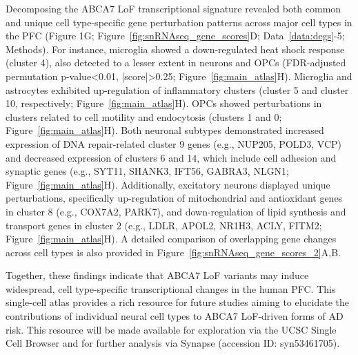 \newcommand{\quoteG}{\textcolor{blue}{The two-dimensional visualization effectively captured the transcriptional landscape of ABCA7 LoF gene changes across all major cell types (Fig1F; Figure~\ref{fig:snRNAseq_gene_scores}A). To summarize this landscape in terms of biological pathways, we grouped genes into clusters based on their positions in the 2D projection and analyzed each cluster for enrichment in biological pathways using the Gene Ontology Biological Process database (Figure~\ref{fig:main_atlas}G; see Methods). This analysis identified several biological pathways broadly affected by ABCA7 LoF in the postmortem human PFC, including pathways related to heat shock response, inflammation, cell dynamics and adhesion, synaptic function, DNA repair, and cellular metabolism (Figure~\ref{fig:main_atlas}G; Data~\ref{data:pathway_enrichments}). \label{quoteG-label}}} 

Decomposing the ABCA7 LoF transcriptional signature revealed both common and unique cell type-specific gene perturbation patterns across major cell types in the PFC (Figure 1G; Figure~\ref{fig:snRNAseq_gene_scores}D; Data~\ref{data:degs}-5; Methods). For instance, microglia showed a down-regulated heat shock response (cluster 4), also detected to a lesser extent in neurons and OPCs (FDR-adjusted permutation p-value<0.01, |score|>0.25; Figure~\ref{fig:main_atlas}H). Microglia and astrocytes exhibited up-regulation of inflammatory clusters (cluster 5 and cluster 10, respectively; Figure~\ref{fig:main_atlas}H). OPCs showed perturbations in clusters related to cell motility and endocytosis (clusters 1 and 0; Figure~\ref{fig:main_atlas}H). Both neuronal subtypes demonstrated increased expression of DNA repair-related cluster 9 genes (e.g., NUP205, POLD3, VCP) and decreased expression of clusters 6 and 14, which include cell adhesion and synaptic genes (e.g., SYT11, SHANK3, IFT56, GABRA3, NLGN1; Figure~\ref{fig:main_atlas}H). Additionally, excitatory neurons displayed unique perturbations, specifically up-regulation of mitochondrial and antioxidant genes in cluster 8 (e.g., COX7A2, PARK7), and down-regulation of lipid synthesis and transport genes in cluster 2 (e.g., LDLR, APOL2, NR1H3, ACLY, FITM2; Figure~\ref{fig:main_atlas}H). A detailed comparison of overlapping gene changes across cell types is also provided in Figure~\ref{fig:snRNAseq_gene_scores_2}A,B.

Together, these findings indicate that ABCA7 LoF variants may induce widespread, cell type-specific transcriptional changes in the human PFC. This single-cell atlas provides a rich resource for future studies aiming to elucidate the contributions of individual neural cell types to ABCA7 LoF-driven forms of AD risk. This resource will be made available for exploration via the UCSC Single Cell Browser and for further analysis via Synapse (accession ID: syn53461705).

